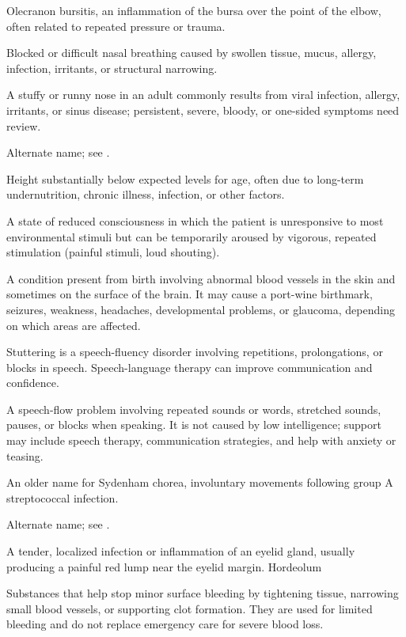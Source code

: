  Olecranon bursitis, an inflammation of the bursa over the point of the elbow, often related to repeated pressure or trauma.

 Blocked or difficult nasal breathing caused by swollen tissue, mucus, allergy, infection, irritants, or structural narrowing.

 A stuffy or runny nose in an adult commonly results from viral infection, allergy, irritants, or sinus disease; persistent, severe, bloody, or one-sided symptoms need review.

 Alternate name; see .

 Height substantially below expected levels for age, often due to long-term undernutrition, chronic illness, infection, or other factors.

 A state of reduced consciousness in which the patient is unresponsive to most environmental stimuli but can be temporarily aroused by vigorous, repeated stimulation (painful stimuli, loud shouting).

 A condition present from birth involving abnormal blood vessels in the skin and sometimes on the surface of the brain. It may cause a port-wine birthmark, seizures, weakness, headaches, developmental problems, or glaucoma, depending on which areas are affected.

 Stuttering is a speech-fluency disorder involving repetitions, prolongations, or blocks in speech. Speech-language therapy can improve communication and confidence.

 A speech-flow problem involving repeated sounds or words, stretched sounds, pauses, or blocks when speaking. It is not caused by low intelligence; support may include speech therapy, communication strategies, and help with anxiety or teasing.

 An older name for Sydenham chorea, involuntary movements following group A streptococcal infection.

 Alternate name; see .

 A tender, localized infection or inflammation of an eyelid gland, usually producing a painful red lump near the eyelid margin.
\synonyms
Hordeolum

 Substances that help stop minor surface bleeding by tightening tissue, narrowing small blood vessels, or supporting clot formation. They are used for limited bleeding and do not replace emergency care for severe blood loss.

